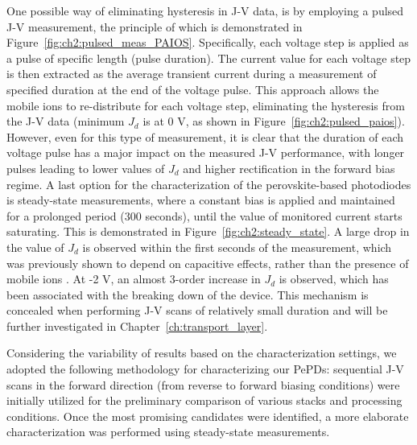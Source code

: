 One possible way of eliminating hysteresis in J-V data, is by employing a pulsed J-V measurement, the principle of which is demonstrated in Figure~\ref{fig:ch2:pulsed_meas_PAIOS}. Specifically, each voltage step is applied as a pulse of specific length (pulse duration). The current value for each voltage step is then extracted as the average transient current during a measurement of specified duration at the end of the voltage pulse. This approach allows the mobile ions to re-distribute for each voltage step, eliminating the hysteresis from the J-V data (minimum $J_d$ is at 0 V, as shown in Figure~\ref{fig:ch2:pulsed_paios}). However, even for this type of measurement, it is clear that the duration of each voltage pulse has a major impact on the measured J-V performance, with longer pulses leading to lower values of $J_d$ and higher rectification in the forward bias regime. A last option for the characterization of the perovskite-based photodiodes is steady-state measurements, where a constant bias is applied and maintained for a prolonged period (300 seconds), until the value of monitored current starts saturating. This is demonstrated in Figure~\ref{fig:ch2:steady_state}. A large drop in the value of $J_d$ is observed within the first seconds of the measurement, which was previously shown to depend on capacitive effects, rather than the presence of mobile ions \cite{Ollearo2021UltralowGeneration}. At -2 V, an almost 3-order increase in $J_d$ is observed, which has been associated with the breaking down of the device. This mechanism is concealed when performing J-V scans of relatively small duration and will be further investigated in Chapter~\ref{ch:transport_layer}. 

Considering the variability of results based on the characterization settings, we adopted the following methodology for characterizing our PePDs: sequential J-V scans in the forward direction (from reverse to forward biasing conditions) were initially utilized for the preliminary comparison of various stacks and processing conditions. Once the most promising candidates were identified, a more elaborate characterization was performed using steady-state measurements.  


